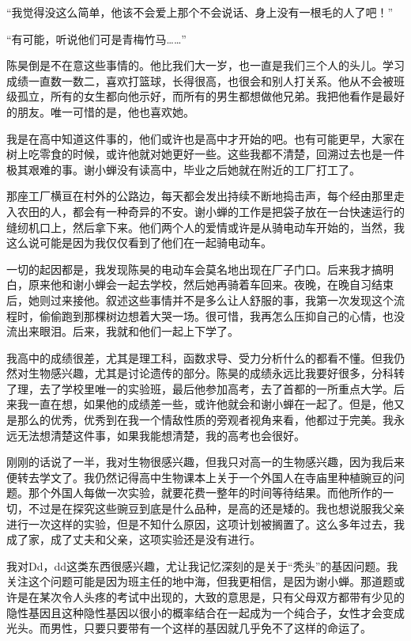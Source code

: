 \documentclass[lang=cn]{elegantpaper}
\begin{document}
“我觉得没这么简单，他该不会爱上那个不会说话、身上没有一根毛的人了吧！”

“有可能，听说他们可是青梅竹马……”

陈昊倒是不在意这些事情的。他比我们大一岁，也一直是我们三个人的头儿。学习成绩一直数一数二，喜欢打篮球，长得很高，也很会和别人打关系。他从不会被班级孤立，所有的女生都向他示好，而所有的男生都想做他兄弟。我把他看作是最好的朋友。唯一可惜的是，他也喜欢她。

我是在高中知道这件事的，他们或许也是高中才开始的吧。也有可能更早，大家在树上吃零食的时候，或许他就对她更好一些。这些我都不清楚，回溯过去也是一件极其艰难的事。谢小蝉没有读高中，毕业之后她就在附近的工厂打工了。

那座工厂横亘在村外的公路边，每天都会发出持续不断地捣击声，每个经由那里走入农田的人，都会有一种奇异的不安。谢小蝉的工作是把袋子放在一台快速运行的缝纫机口上，然后拿下来。他们两个人的爱情或许是从骑电动车开始的，当然，我这么说可能是因为我仅仅看到了他们在一起骑电动车。

一切的起因都是，我发现陈昊的电动车会莫名地出现在厂子门口。后来我才搞明白，原来他和谢小蝉会一起去学校，然后她再骑着车回来。夜晚，在晚自习结束后，她则过来接他。叙述这些事情并不是多么让人舒服的事，我第一次发现这个流程时，偷偷跑到那棵树边想着大哭一场。很可惜，我再怎么压抑自己的心情，也没流出来眼泪。后来，我就和他们一起上下学了。

我高中的成绩很差，尤其是理工科，函数求导、受力分析什么的都看不懂。但我仍然对生物感兴趣，尤其是讨论遗传的部分。陈昊的成绩永远比我要好很多，分科转了理，去了学校里唯一的实验班，最后他参加高考，去了首都的一所重点大学。后来我一直在想，如果他的成绩差一些，或许他就会和谢小蝉在一起了。但是，他又是那么的优秀，优秀到在我一个情敌性质的旁观者视角来看，他都过于完美。我永远无法想清楚这件事，如果我能想清楚，我的高考也会很好。

刚刚的话说了一半，我对生物很感兴趣，但我只对高一的生物感兴趣，因为我后来便转去学文了。我仍然记得高中生物课本上关于一个外国人在寺庙里种植豌豆的问题。那个外国人每做一次实验，就要花费一整年的时间等待结果。而他所作的一切，不过是在探究这些豌豆到底是什么品种，是高的还是矮的。我也想说服我父亲进行一次这样的实验，但是不知什么原因，这项计划被搁置了。这么多年过去，我成了家，成了丈夫和父亲，这项实验还是没有进行。

我对Dd，dd这类东西很感兴趣，尤让我记忆深刻的是关于“秃头”的基因问题。我关注这个问题可能是因为班主任的地中海，但我更相信，是因为谢小蝉。那道题或许是在某次令人头疼的考试中出现的，大致的意思是，只有父母双方都带有少见的隐性基因且这种隐性基因以很小的概率结合在一起成为一个纯合子，女性才会变成光头。而男性，只要只要带有一个这样的基因就几乎免不了这样的命运了。
\end{document}
